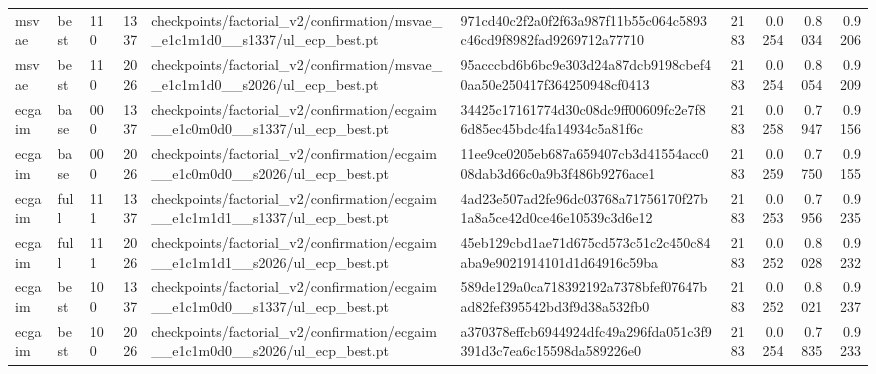 \begin{tabular}{lllrllrrrr}
msvae & best & 110 & 1337 & checkpoints/factorial_v2/confirmation/msvae__e1c1m1d0__s1337/ul_ecp_best.pt & 971cd40c2f2a0f2f63a987f11b55c064c5893c46cd9f8982fad9269712a77710 & 2183 & 0.0254 & 0.8034 & 0.9206 \\
msvae & best & 110 & 2026 & checkpoints/factorial_v2/confirmation/msvae__e1c1m1d0__s2026/ul_ecp_best.pt & 95acccbd6b6bc9e303d24a87dcb9198cbef40aa50e250417f364250948cf0413 & 2183 & 0.0254 & 0.8054 & 0.9209 \\
ecgaim & base & 000 & 1337 & checkpoints/factorial_v2/confirmation/ecgaim__e1c0m0d0__s1337/ul_ecp_best.pt & 34425c17161774d30c08dc9ff00609fc2e7f86d85ec45bdc4fa14934c5a81f6c & 2183 & 0.0258 & 0.7947 & 0.9156 \\
ecgaim & base & 000 & 2026 & checkpoints/factorial_v2/confirmation/ecgaim__e1c0m0d0__s2026/ul_ecp_best.pt & 11ee9ce0205eb687a659407cb3d41554acc008dab3d66c0a9b3f486b9276ace1 & 2183 & 0.0259 & 0.7750 & 0.9155 \\
ecgaim & full & 111 & 1337 & checkpoints/factorial_v2/confirmation/ecgaim__e1c1m1d1__s1337/ul_ecp_best.pt & 4ad23e507ad2fe96dc03768a71756170f27b1a8a5ce42d0ce46e10539c3d6e12 & 2183 & 0.0253 & 0.7956 & 0.9235 \\
ecgaim & full & 111 & 2026 & checkpoints/factorial_v2/confirmation/ecgaim__e1c1m1d1__s2026/ul_ecp_best.pt & 45eb129cbd1ae71d675cd573c51c2c450c84aba9e9021914101d1d64916c59ba & 2183 & 0.0252 & 0.8028 & 0.9232 \\
ecgaim & best & 100 & 1337 & checkpoints/factorial_v2/confirmation/ecgaim__e1c1m0d0__s1337/ul_ecp_best.pt & 589de129a0ca718392192a7378bfef07647bad82fef395542bd3f9d38a532fb0 & 2183 & 0.0252 & 0.8021 & 0.9237 \\
ecgaim & best & 100 & 2026 & checkpoints/factorial_v2/confirmation/ecgaim__e1c1m0d0__s2026/ul_ecp_best.pt & a370378effcb6944924dfc49a296fda051c3f9391d3c7ea6c15598da589226e0 & 2183 & 0.0254 & 0.7835 & 0.9233 \\
\bottomrule
\end{tabular}
